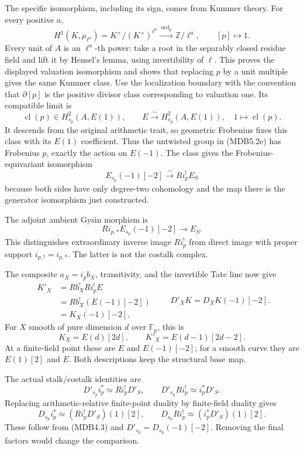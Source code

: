 \documentclass[
]{report}
\begin{document}
The specific isomorphism, including its sign, comes from Kummer theory.
For every positive \(a\), \[
H^1(K,\mu_{\ell^a})=K^\times/(K^\times)^{\ell^a}
\xrightarrow{\ \operatorname{ord}_p\ }\mathbb Z/\ell^a,\qquad [p]\mapsto1.
\tag{MDB5.2f}
\] Every unit of \(A\) is an \(\ell^a\)-th power: take a root in the
separably closed residue field and lift it by Hensel's lemma, using
invertibility of \(\ell\). This proves the displayed valuation
isomorphism and shows that replacing \(p\) by a unit multiple gives the
same Kummer class. Use the localization boundary with the convention
that \(\partial[p]\) is the positive divisor class corresponding to
valuation one. Its compatible limit is \[
\operatorname{cl}(p)\in H^2_{\overline s_p}(A,E(1)),
\qquad
E\xrightarrow{\sim}H^2_{\overline s_p}(A,E(1)),\quad
1\mapsto\operatorname{cl}(p).
\tag{MDB5.2g}
\] It descends from the original arithmetic trait, so geometric
Frobenius fixes this class with its \(E(1)\) coefficient. Thus the
untwisted group in (MDB5.2e) has Frobenius \(p\), exactly the action on
\(E(-1)\). The class gives the Frobenius-equivariant isomorphism \[
E_{s_p}(-1)[-2]\xrightarrow{\sim}Ri_p^!E_S
\tag{MDB5.2h}
\] because both sides have only degree-two cohomology and the map there
is the generator isomorphism just constructed.

The adjoint ambient Gysin morphism is \[
Ri_{p,*}E_{s_p}(-1)[-2]\longrightarrow E_S.
\tag{MDB5.2i}
\] This distinguishes extraordinary inverse image \(Ri_p^!\) from direct
image with proper support \(i_{p,!}=i_{p,*}\). The latter is not the
costalk complex.

The composite \(a_X=i_pb_X\), transitivity, and the invertible Tate line
now give \[
\begin{aligned}
K'_X
&=Rb_X^!Ri_p^!E\\
&=Rb_X^!(E(-1)[-2])\\
&=K_X(-1)[-2],
\end{aligned}
\qquad
\boxed{D'_XK=D_XK(-1)[-2].}
\tag{MDB5.3}
\] For \(X\) smooth of pure dimension \(d\) over \(\mathbb F_p\), this
is \[
K_X=E(d)[2d],\qquad K'_X=E(d-1)[2d-2].
\tag{MDB5.4}
\] At a finite-field point these are \(E\) and \(E(-1)[-2]\); for a
smooth curve they are \(E(1)[2]\) and \(E\). Both descriptions keep the
structural base map.

The actual stalk/costalk identities are \[
D'_{s_p}i_p^*\simeq Ri_p^!D'_S,\qquad
D'_{s_p}Ri_p^!\simeq i_p^*D'_S.
\tag{MDB5.5}
\] Replacing arithmetic-relative finite-point duality by finite-field
duality gives \[
\boxed{
D_{s_p}i_p^*\simeq(Ri_p^!D'_S)(1)[2],\qquad
D_{s_p}Ri_p^!\simeq(i_p^*D'_S)(1)[2].
}
\tag{MDB5.6}
\] These follow from (MDB4.3) and \(D'_{s_p}=D_{s_p}(-1)[-2]\). Removing
the final factors would change the comparison.
\end{document}
